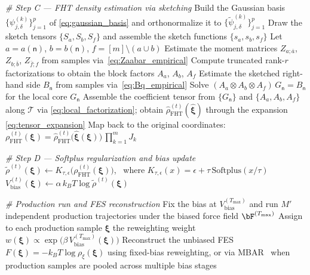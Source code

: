 \documentclass[a4paper,fleqn]{cas-sc}
\theoremstyle{definition}
\begin{document}
\begin{algorithm}[ht]
\begin{algorithmic}[1]
    \STATE \emph{\# Step C --- FHT density estimation via sketching}
    \STATE Build the Gaussian basis $\{\psi_{j,\delta}^{(k)}\}_{j=1}^{p}$ of \eqref{eq:gaussian_basis} and orthonormalize it to $\{\widetilde\psi_{j,\delta}^{(k)}\}_{j=1}^p$
    \STATE Draw the sketch tensors $\{S_a,S_b,S_f\}$ and assemble the sketch functions $\{s_a,s_b,s_f\}$
        \STATE Let $a = a(\mathsf n)$, $b = b(\mathsf n)$, $f = [m]\setminus(a\cup b)$
        \STATE Estimate the moment matrices $Z_{a;\bar a}$, $Z_{b;\bar b}$, $Z_{\bar f;f}$ from samples via~\eqref{eq:Zaabar_empirical}
        \STATE Compute truncated rank-$r$ factorizations to obtain the block factors $A_a$, $A_b$, $A_f$
        \STATE Estimate the sketched right-hand side $B_{\mathsf n}$ from samples via~\eqref{eq:Bq_empirical}
        \STATE Solve $(A_a \otimes A_b \otimes A_f)\, G_\mathsf n = B_{\mathsf n}$ for the local core $G_{\mathsf n}$
    \ENDFOR
    \STATE Assemble the coefficient tensor from $\{G_{\mathsf n}\}$ and $\{A_a,A_b,A_f\}$ along $\mathcal{T}$ via \eqref{eq:local_factorization}; obtain $\widehat{\rho}_{\mathrm{FHT}}^{(t)}(\widehat{\boldsymbol{\xi}})$ through the expansion \eqref{eq:tensor_expansion}
    \STATE Map back to the original coordinates: $\rho_{\mathrm{FHT}}^{(t)}(\boldsymbol{\xi}) = \widehat{\rho}_{\mathrm{FHT}}^{(t)}\bigl(\widehat{\boldsymbol{\xi}}(\boldsymbol{\xi})\bigr)\,\prod_{k=1}^{m} J_k$
 
    \STATE \emph{\# Step D --- Softplus regularization and bias update}
    \STATE $\widetilde{\rho}^{(t)}(\boldsymbol{\xi}) \leftarrow K_{\tau,\epsilon}\!\bigl(\rho_{\mathrm{FHT}}^{(t)}(\boldsymbol{\xi})\bigr)$, \ where $K_{\tau,\epsilon}(x) = \epsilon + \tau\,\mathrm{Softplus}(x/\tau)$
    \STATE $V_{\mathrm{bias}}^{(t)}(\boldsymbol{\xi}) \leftarrow \alpha\, k_B T \log \widetilde{\rho}^{(t)}(\boldsymbol{\xi})$
\ENDFOR
 
\STATE \emph{\# Production run and FES reconstruction}
\STATE Fix the bias at $V_{\mathrm{bias}}^{(T_{\max})}$ and run $M'$ independent production trajectories under the biased force field $\bF^{(T_{\max})}$
\STATE Assign to each production sample $\boldsymbol{\xi}$ the reweighting weight $w(\boldsymbol{\xi}) \propto \exp\!\bigl(\beta\, V_{\mathrm{bias}}^{(T_{\max})}(\boldsymbol{\xi})\bigr)$
\STATE Reconstruct the unbiased FES $F(\boldsymbol{\xi}) = -k_B T \log \rho_\xi(\boldsymbol{\xi})$ using fixed-bias reweighting, or via MBAR~\cite{shirts2008statistically} when production samples are pooled across multiple bias stages
\end{algorithmic}
\end{algorithm}
 
\end{document}
